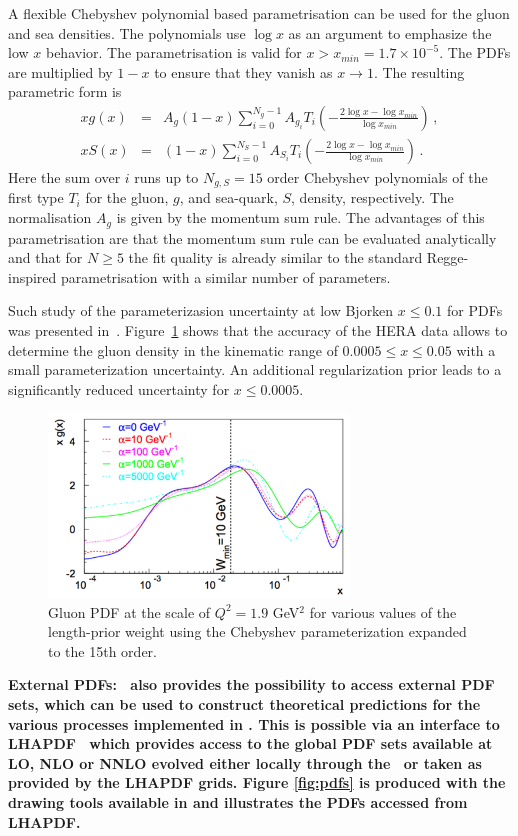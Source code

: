 \begin{description}
A flexible Chebyshev polynomial based parametrisation can be used for the gluon and sea densities. The polynomials
use $\log x$ as an argument to emphasize the low $x$ behavior. 
The parametrisation is valid for $x>x_{min} = 1.7\times 10^{-5}$. The PDFs are multiplied
by $1-x$ to ensure that they vanish as $x\to 1$. The resulting parametric form is 
\begin{eqnarray}
x g(x) &=& A_g \left(1-x\right) \sum_{i=0}^{N_g-1} A_{g_i} T_i \left(-\frac{\textstyle 2\log x - \log x_{min} } {\textstyle \log x_{min} } \right)\,, \label{eq:glu} \\
x S(x) &=& \left(1-x\right) \sum_{i=0}^{N_S-1} A_{S_i} T_i \left(-\frac{\textstyle 2\log x - \log x_{min} } {\textstyle \log x_{min} } \right)\,. \label{eq:sea} 
\end{eqnarray}
Here the sum over $i$ runs up to $N_{g,S}=15$ order Chebyshev polynomials of the first type $T_i$ for
the gluon, $g$, and sea-quark, $S$, density, respectively. 
The normalisation $A_g$ is given by the momentum sum rule.
%
The advantages of this parametrisation are that the momentum sum rule can be evaluated analytically 
and that for $N \ge 5$ the fit quality is already similar
to the standard Regge-inspired parametrisation with a similar number of parameters.

Such study of the parameterizasion uncertainty at low Bjorken $x \le 0.1$ for PDFs was presented 
in~\cite{Chebyshev}. Figure~\ref{fig:cheb} shows that the accuracy of 
the HERA data allows to determine the gluon density in the kinematic range of $0.0005 \le x \le 0.05$ 
with a small parameterization uncertainty. An additional regularization prior leads to a 
significantly reduced uncertainty for $x \le 0.0005$.
\begin{figure}[!ht]
 \centering
  \includegraphics[width=8cm]{cheb.pdf}
 \caption{Gluon PDF at the scale of $Q^2=1.9$ GeV$^2$ for various values of the length-prior 
          weight using the Chebyshev parameterization expanded to the 15th order.}
 \label{fig:cheb}
\end{figure}

%
\item \bf{External PDFs:} \rm 
\fitter\ also provides the possibility to access external PDF sets, which can be used to construct 
theoretical predictions for the various processes implemented in \fitter . This is possible via an 
interface to LHAPDF~\cite{lhapdf,lhapdfweb} which provides access to the global PDF sets available at LO, NLO 
or NNLO evolved either locally through the \fitter\ or taken as provided by the LHAPDF grids. 
Figure \ref{fig:pdfs} is produced with the drawing tools available in \fitter and illustrates 
the PDFs accessed from LHAPDF.
\end{description}
